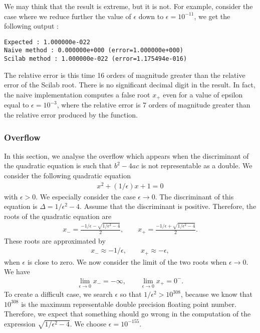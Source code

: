 We may think that the result is extreme, but it 
is not. For example, consider the case where we reduce further the value of $\epsilon$ down to 
$\epsilon=10^{-11}$, we get the following output :
\begin{lstlisting}
Expected : 1.000000e-022
Naive method : 0.000000e+000 (error=1.000000e+000)
Scilab method : 1.000000e-022 (error=1.175494e-016)
\end{lstlisting}

The relative error is this time 16 orders of magnitude 
greater than the relative error of the Scilab root.
There is no significant decimal digit in the result. 
In fact, the naive implementation computes a false root $x_+$ even for 
a value of epsilon equal to $\epsilon=10^{-3}$, where the relative 
error is 7 orders of magnitude greater than the relative error produced by the 
 function.

\subsubsection{Overflow}
\label{section-exp-quadraticoverflow}

In this section, we analyse the overflow which appears  
when the discriminant of the quadratic equation 
is such that $b^2- 4ac$ is not representable as a double.
We consider the following quadratic equation 
\begin{eqnarray}
\label{sinn-eq-overflowerror}
x^2 + (1/\epsilon)x + 1 = 0
\end{eqnarray}
with $\epsilon>0$. We especially consider the case $\epsilon\rightarrow 0$. 
The discriminant of this equation is $\Delta=1/\epsilon^2 -4$. Assume that the discriminant is positive.
Therefore, the roots of the quadratic equation are 
\begin{eqnarray}
x_- = \frac{-1/\epsilon- \sqrt{1/\epsilon^2-4}}{2}, \qquad
x_+ = \frac{-1/\epsilon+ \sqrt{1/\epsilon^2-4}}{2}.
\end{eqnarray}
These roots are approximated by 
\begin{eqnarray}
\label{sinn-eq-rootsoverflowapprox}
x_- \approx  -1/\epsilon, \qquad
x_+ \approx  -\epsilon,
\end{eqnarray}
when $\epsilon$ is close to zero.
We now consider the limit of the two roots when $\epsilon \rightarrow 0$. We have 
\begin{eqnarray}
\lim_{\epsilon\rightarrow 0} x_- = -\infty, \qquad
\lim_{\epsilon\rightarrow 0} x_+ = 0^-.
\end{eqnarray}
To create a difficult case, we search $\epsilon$ so that 
$1/\epsilon^2 > 10^{308}$, because we know that $10^{308}$
is the maximum representable double precision floating 
point number. Therefore, we expect that something should go wrong 
in the computation of the expression $\sqrt{1/\epsilon^2-4}$. 
We choose $\epsilon=10^{-155}$.

